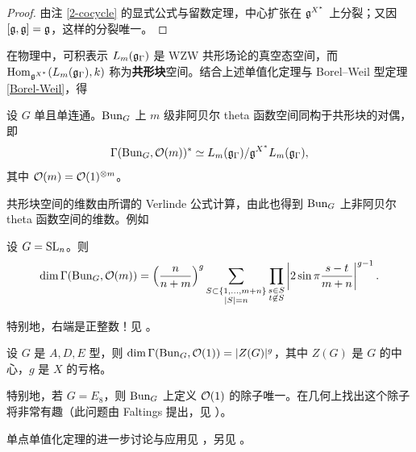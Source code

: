 \begin{proof}
由注 \ref{2-cocycle} 的显式公式与留数定理，中心扩张在 ${\mathfrak g}^{X^*}$ 上分裂；又因 $[{\mathfrak g},{\mathfrak g}]={\mathfrak g}$，这样的分裂唯一。
\end{proof}

在物理中，可积表示 $L_m({\mathfrak g}_{\Gamma})$ 是 WZW 共形场论的真空态空间，而 ${\operatorname{Hom}}_{{\mathfrak g}^{X^*}}(L_m({\mathfrak g}_{\Gamma}),k)$ 称为\textbf{共形块}空间。结合上述单值化定理与 Borel--Weil 型定理 \ref{Borel-Weil}，得

\begin{cor}
设 $G$ 单且单连通。${\operatorname{Bun}}_G$ 上 $m$ 级非阿贝尔 theta 函数空间同构于共形块的对偶，即
\[\Gamma({\operatorname{Bun}}_G,{\mathcal O}(m))^*\simeq L_m({\mathfrak g}_{\Gamma})/{\mathfrak g}^{X^*} L_m({\mathfrak g}_{\Gamma}),\]
其中 ${\mathcal O}(m)={\mathcal O}(1)^{\otimes m}$。
\end{cor}

共形块空间的维数由所谓的 Verlinde 公式计算，由此也得到 ${\operatorname{Bun}}_G$ 上非阿贝尔 theta 函数空间的维数。例如

\begin{cor}
设 $G={\operatorname{SL}}_n$。则
\[\dim \Gamma({\operatorname{Bun}}_G,{\mathcal O}(m))= \Big(\frac{n}{n+m}\Big)^g \sum_{\substack{S\subset \{1,\ldots,m+n\}\\|S|=n}}\prod_{\substack{s\in S\\ t\not\in S}}\left|2\sin\pi\frac{s-t}{m+n}\right|^{g-1}.\]
\end{cor}

特别地，右端是正整数！见 \cite[Corollary 8.6]{BL}。

\begin{cor}
设 $G$ 是 $A,D,E$ 型，则 $\dim {\Gamma}({\operatorname{Bun}}_G,{\mathcal O}(1))=|Z(G)|^g$，其中 $Z(G)$ 是 $G$ 的中心，$g$ 是 $X$ 的亏格。
\end{cor}

特别地，若 $G=E_8$，则 ${\operatorname{Bun}}_G$ 上定义 ${\mathcal O}(1)$ 的除子唯一。在几何上找出这个除子将非常有趣（此问题由 Faltings 提出，见 \cite{Fa2}）。

单点单值化定理的进一步讨论与应用见 \cite{BL, LS, BLS, So0, So, He}，另见 \cite{KNR, KN}。
